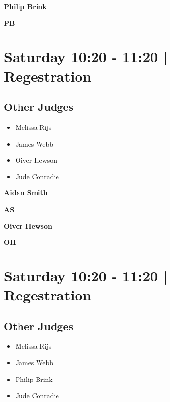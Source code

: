 \documentclass[10pt]{article}
\newcommand{\newtitle}[1]{\begin{center}{\Huge\bfseries #1 }\\ \vspace{5mm}\end{center}}
\newcommand{\newsubtitle}[1]{\begin{center}{\color{grey}\Large\bfseries #1 }\\ \vspace{5mm}\end{center}}
\begin{document}
    
	\clearpage

		\newtitle{Philip Brink}
	\newsubtitle{PB}

            \section*{Saturday 10:20
        -
        11:20
        |
         Regestration}
        
                
        \subsection*{Other Judges}
        
            \begin{itemize}
                            \item Melissa Rijs
                            \item James Webb
                            \item Oiver Hewson
                            \item Jude Conradie
                        \end{itemize}
        

    
	\clearpage

		\newtitle{Aidan Smith}
	\newsubtitle{AS}

    
	\clearpage

		\newtitle{Oiver Hewson}
	\newsubtitle{OH}

            \section*{Saturday 10:20
        -
        11:20
        |
         Regestration}
        
                
        \subsection*{Other Judges}
        
            \begin{itemize}
                            \item Melissa Rijs
                            \item James Webb
                            \item Philip Brink
                            \item Jude Conradie
                        \end{itemize}
        
\end{document}
